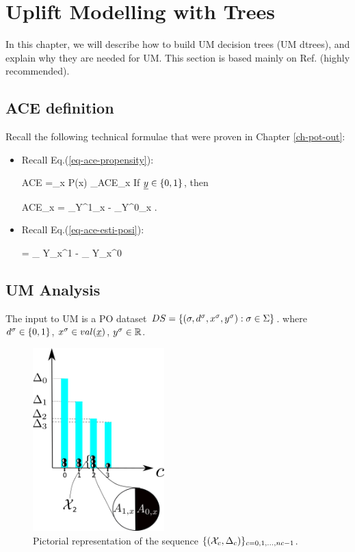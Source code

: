 \documentclass[12pt]{report}
\begin{document}
\chapter{Uplift Modelling with Trees}
\label{ch-uplift-tree}


In this chapter,
we will describe
how to build UM decision trees (UM dtrees),
and explain why they are needed
for UM. This section is based
mainly on Ref.\cite{jaros} (highly recommended).

\section{ACE definition}
Recall
the following technical formulae
that were proven in
Chapter \ref{ch-pot-out}:

\begin{itemize}

\item
Recall Eq.(\ref{eq-ace-propensity}):

\beq
ACE =\sum_x P(x)
_{ACE_x}
\eeq
If $\rvy\in \bool$, then

\beq
ACE_x
=
_{\displaystyle Y^1_x}
-
_{\displaystyle Y^0_x}
\;.
\eeq

\item
Recall
Eq.(\ref{eq-ace-esti-posi}):

\beq
{}
=
_
{\displaystyle Y_x^1}
-
_
{\displaystyle Y_x^0}
\label{eq-est-ace-uplift}
\eeq
\end{itemize}

\section{UM Analysis}

The input
to UM is a PO
dataset $DS= \{ (\sigma, d^\sigma, x^\sigma, y^\sigma):
 \sigma\in\Sigma\}$.
where $d^\sigma\in \{0,1\}$, $x^\s \in val(\rvx)$,
$y^\sigma\in { \mathbb{R}}$.

\begin{figure}[h!]
\centering
\includegraphics[width=2in]
{../uplift/uplift-bins.png}
\caption{
Pictorial
representation
of the sequence
$\{({\cal X}_c, \Delta_c)\}_{c=0, 1, \ldots, nc-1}$.
}
\label{fig-uplift-bins}
\end{figure}
\end{document}
